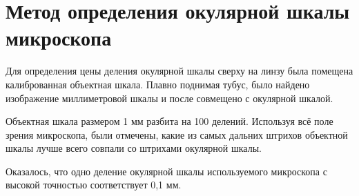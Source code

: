 \section{Метод определения окулярной шкалы микроскопа}
Для определения цены деления окулярной шкалы сверху на линзу была помещена калиброванная объектная шкала. Плавно поднимая тубус, было найдено изображение миллиметровой шкалы и после совмещено с окулярной шкалой.

Объектная шкала размером 1 мм разбита на 100 делений. Используя всё поле зрения микроскопа, были отмечены, какие из самых дальних штрихов объектной шкалы лучше всего совпали со штрихами окулярной шкалы.

Оказалось, что одно деление окулярной шкалы используемого микроскопа с высокой точностью соответствует 0,1 мм.